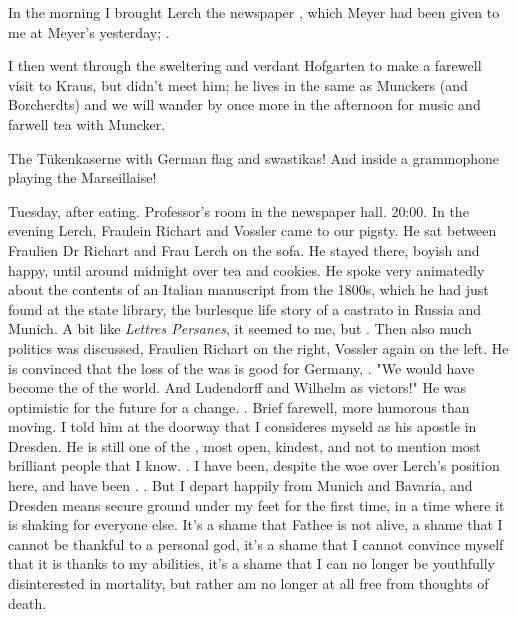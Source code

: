\documentclass{article}
\begin{document}
In the morning I brought Lerch the newspaper , which Meyer had been given to me at Meyer's yesterday; .

I then went through the sweltering and verdant Hofgarten to make a farewell visit to Kraus, but didn't meet him; he lives in the same  as Munckers (and Borcherdts) and we will
wander by once more in the afternoon for music and farwell tea with Muncker.

The T\"ukenkaserne with German flag and swastikas! And inside a grammophone playing the Marseillaise!

\date{March 23, 1920}
Tuesday, after eating. Professor's room in the newspaper hall. 20:00.
In the evening Lerch, Fraulein Richart and Vossler came to our pigsty. He sat between Fraulien Dr Richart and Frau Lerch on the  sofa. He stayed there, boyish and happy, until around midnight over tea and cookies. He spoke very animatedly about the contents of an Italian manuscript from the 1800s, which he had just found at the state library, the burlesque life story of a castrato in Russia and Munich. A bit like \textit{Lettres Persanes}, it seemed to me, but . Then also much politics was discussed, Fraulien Richart on the right, Vossler again on the left. He is convinced that the loss of the was is good for Germany, . "We would have become the  of the world. And Ludendorff and Wilhelm as victors!" He was optimistic for the future for a change. . Brief farewell, more humorous than moving. I told him at the doorway that I consideres myseld as his apostle in Dresden. 
He is still one of the , most open, kindest, and not to mention most brilliant people that I know. . I have been, despite the woe over Lerch's position here,  and have been . . But I depart happily from Munich and Bavaria, and Dresden means secure ground under my feet for the first time, in a time where it is shaking for everyone else. It's a shame that Fathee is not alive, a shame that I cannot be thankful to a personal god, it's a shame that I cannot convince myself that it is thanks to my abilities, it's a shame that I can no longer be youthfully disinterested in mortality, but rather am no longer at all free from thoughts of death.
\end{document}
